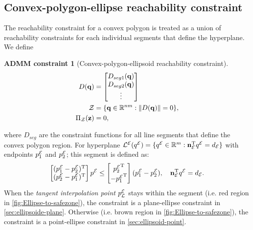 \documentclass[10pt,twocolumn,twoside]{IEEEtran}
\newtheorem{constraint}{ADMM constraint}
\def\sZ{\mathcal{Z}}
\begin{document}
\subsection{Convex-polygon-ellipse reachability constraint}\label{sec:ellipse-region-constraint}  
The reachability constraint for a convex polygon is treated as a union of reachability constraints for each individual segments that define the hyperplane. We define
\begin{constraint}[Convex-polygon-ellipsoid reachability constraint]\label{constraint:polygon-ellipsoid}
\begin{align}
D(\vq) &= \bmat{D_{seg1}(\vq)\\D_{seg2}(\vq)\\ \vdots} \label{eq:region_ellipsoid_constraint}\\
  \sZ &= \{\vq\in\mathbb{R}^{nm}:\norm{D(\vq)} = 0 \},\\
   \Pi_\sZ(\vz) & = 0, 
\end{align}
\end{constraint}
where $D_{seg}$ are the constraint functions for all line segments that define the convex polygon region. 
For hyperplane ${\mathcal{L}^{\mathcal{E}}}({q^{\mathcal{E}}}) = \{ {q^{\mathcal{E}}}\in\mathbb{R}^m:  \mathbf{n}_{\mathcal{E}}^\mathrm{T} {q^{\mathcal{E}}} = d_{\mathcal{E}}\}$ with endpoints ${p_1^{\mathcal{E}}}$ and ${p_2^{\mathcal{E}}}$; this segment is defined as:
\begin{equation}
\begin{bmatrix}({p_1^{\mathcal{E}}}- {p_2^{\mathcal{E}}})^\mathrm{T}\\( {p_2^{\mathcal{E}}} - {p_1^{\mathcal{E}}})^\mathrm{T}\end{bmatrix}  {p^{\mathcal{E}}} \leq \begin{bmatrix} {p_2^{\mathcal{E}}}^\mathrm{T}\\- {p_1^{\mathcal{E}}}^\mathrm{T}\end{bmatrix}( {p_1^{\mathcal{E}}}- {p_2^{\mathcal{E}}}), \quad \mathbf{n}_{\mathcal{E}}^\mathrm{T} {q^{\mathcal{E}}} = d_{\mathcal{E}}.
\end{equation}
When the \emph{tangent interpolation point} ${p_{\mathcal{L}}^{\mathcal{E}}}$ stays within the segment (i.e. red region in \cref{fig:Ellipse-to-safezone}), the constraint is a plane-ellipse constraint in \cref{sec:ellipsoide-plane}. Otherwise (i.e. brown region in \cref{fig:Ellipse-to-safezone}), the constraint is a point-ellipse constraint in \cref{sec:ellipsoid-point}.
\end{document}
